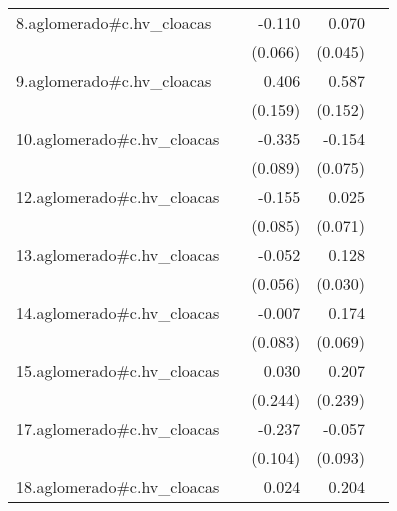 {\begin{longtable}{l*{4}{D{.}{.}{-1}}}
\addlinespace
8.aglomerado#c.hv\_cloacas&                     &      -0.110         &       0.070         &                     \\
            &                     &     (0.066)         &     (0.045)         &                     \\
\addlinespace
9.aglomerado#c.hv\_cloacas&                     &       0.406\sym{*}  &       0.587\sym{***}&                     \\
            &                     &     (0.159)         &     (0.152)         &                     \\
\addlinespace
10.aglomerado#c.hv\_cloacas&                     &      -0.335\sym{***}&      -0.154\sym{*}  &                     \\
            &                     &     (0.089)         &     (0.075)         &                     \\
\addlinespace
12.aglomerado#c.hv\_cloacas&                     &      -0.155         &       0.025         &                     \\
            &                     &     (0.085)         &     (0.071)         &                     \\
\addlinespace
13.aglomerado#c.hv\_cloacas&                     &      -0.052         &       0.128\sym{***}&                     \\
            &                     &     (0.056)         &     (0.030)         &                     \\
\addlinespace
14.aglomerado#c.hv\_cloacas&                     &      -0.007         &       0.174\sym{*}  &                     \\
            &                     &     (0.083)         &     (0.069)         &                     \\
\addlinespace
15.aglomerado#c.hv\_cloacas&                     &       0.030         &       0.207         &                     \\
            &                     &     (0.244)         &     (0.239)         &                     \\
\addlinespace
17.aglomerado#c.hv\_cloacas&                     &      -0.237\sym{*}  &      -0.057         &                     \\
            &                     &     (0.104)         &     (0.093)         &                     \\
\addlinespace
18.aglomerado#c.hv\_cloacas&                     &       0.024         &       0.204\sym{***}&                     \\

\end{longtable}}
